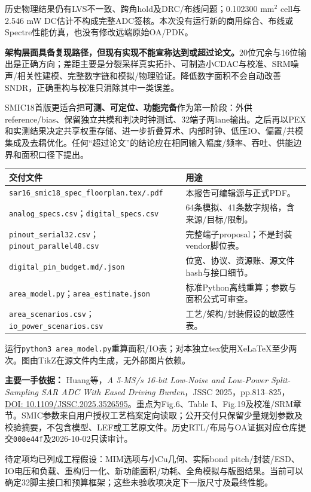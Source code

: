 \documentclass[10pt,a4paper,fontset=fandol]{ctexart}
\newcommand{\sub}[1]{\vspace{2mm}{\color{navy}\large\bfseries #1}\par}
\newcommand{\note}[1]{\colorbox{pale}{\parbox{\dimexpr\linewidth-2\fboxsep}{#1}}}
\begin{document}
历史物理结果仍有LVS不一致、跨角hold及DRC/布线问题；0.102300 mm$^2$ cell与2.546 mW DC估计不构成完整ADC签核。本次没有运行新的商用综合、布线或Spectre性能仿真，也没有修改远端原始OA/PDK。

\sub{10. 与论文的差距怎样判断}
\textbf{架构层面具备复现路径，但现有实现不能宣称达到或超过论文。}20位冗余与16位输出是正确方向；差距主要是分裂采样真实拓扑、可制造小CDAC与校准、SRM噪声/相关性建模、完整数字链和模拟/物理验证。降低数字面积不会自动改善SNDR，正确重构与校准只消除其中一类误差。

SMIC18首版更适合把\textbf{可测、可定位、功能完备}作为第一阶段：外供reference/bias、保留独立共模和判决时钟测试、32端子两lane输出。之后再以PEX和实测结果决定共享权重存储、进一步折叠算术、内部时钟、低压IO、偏置/共模集成及去耦优化。任何“超过论文”的结论应在相同输入幅度/频率、吞吐、供能边界和面积口径下提出。

\sub{11. 可复现交付与依据}
\begin{tabularx}{\linewidth}{P{66mm}Y}\toprule
交付文件 & 用途\\\midrule
\texttt{sar16\_smic18\_spec\_floorplan.tex/.pdf} & 本报告可编辑源与正式PDF。\\
\texttt{analog\_specs.csv}；\texttt{digital\_specs.csv} & 64条模拟、41条数字规格，含来源/目标/限制。\\
\texttt{pinout\_serial32.csv}；\texttt{pinout\_parallel48.csv} & 完整端子proposal；不是封装vendor脚位表。\\
\texttt{digital\_pin\_budget.md/.json} & 位宽、协议、资源账、源文件hash与接口细节。\\
\texttt{area\_model.py}；\texttt{area\_estimate.json} & 标准Python离线重算；参数与面积公式可审查。\\
\texttt{area\_scenarios.csv}；\texttt{io\_power\_scenarios.csv} & 工艺/架构/封装假设的敏感性表。\\\bottomrule
\end{tabularx}

运行\texttt{python3 area\_model.py}重算面积/IO表；对本独立tex使用XeLaTeX至少两次。图由TikZ在源文件内生成，无外部图片依赖。

\textbf{主要一手依据：} Huang等，\emph{A 5-MS/s 16-bit Low-Noise and Low-Power Split-Sampling SAR ADC With Eased Driving Burden}，JSSC 2025，pp.813--825，\href{https://doi.org/10.1109/JSSC.2025.3526595}{DOI: 10.1109/JSSC.2025.3526595}。重点为Fig.6、Table I、Fig.19及校准/SRM章节。SMIC参数来自用户授权工艺档案定向读取；公开交付只保留少量规划参数及校验摘要，不包含模型、LEF或工艺原文件。历史RTL/布局与OA证据对应仓库提交\texttt{008e44f}及2026-10-02只读审计。

\note{待定项均已列成工程假设：MIM选项与小Cu几何、实际bond pitch/封装/ESD、IO电压和负载、重构归一化、新功能面积/功耗、全角模拟与版图结果。当前可以确定32脚主接口和预算框架；这些未验收项决定下一版尺寸及最终性能。}
\end{document}
